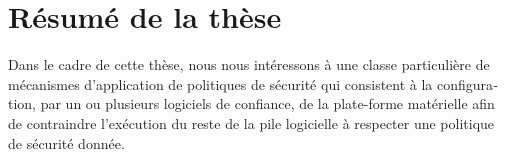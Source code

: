 \chapter{Résumé de la thèse}

\begin{otherlanguage}{french}
  Dans le cadre de cette thèse, nous nous intéressons à une classe particulière
  de mécanismes d’application de politiques de sécurité qui consistent à la
  configuration, par un ou plusieurs logiciels de confiance, de la plate-forme
  matérielle afin de contraindre l’exécution du reste de la pile logicielle à
  respecter une politique de sécurité donnée.
\end{otherlanguage}
